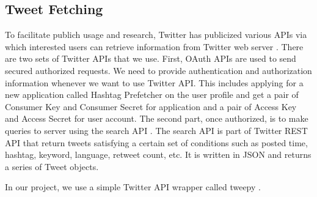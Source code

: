 \documentclass[letterpaper,11pt,twocolumn]{article}
\begin{document}
\subsection{Tweet Fetching}
To facilitate publich usage and research, Twitter has publicized various APIs via which interested users can retrieve information from Twitter web server \cite{twitterdocument}. There are two sets of Twitter APIs that we use. First, OAuth APIs \cite{twitteroauth} are used to send secured authorized requests. We need to provide authentication and authorization information whenever we want to use Twitter API. This includes applying for a new application called Hashtag Prefetcher on the user profile and get a pair of Consumer Key and Consumer Secret for application and a pair of Access Key and Access Secret for user account. The second part, once authorized, is to make queries to server using the search API \cite{twittersearch}. The search API is part of Twitter REST API that return tweets satisfying a certain set of conditions such as posted time, hashtag, keyword, language, retweet count, etc. It is written in JSON and returns a series of Tweet objects.

In our project, we use a simple Twitter API wrapper called tweepy \cite{tweepy}.
\end{document}
